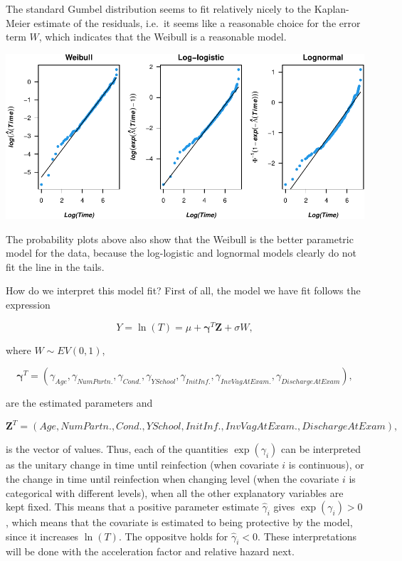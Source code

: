 \documentclass[
]{article}
\begin{document}
The standard Gumbel distribution seems to fit relatively nicely to the Kaplan-Meier estimate of the residuals, i.e.~it seems like a reasonable choice for the error term \(W\), which indicates that the Weibull is a reasonable model.

\includegraphics{practical_files/figure-latex/cumhaz-plot-1.pdf}

The probability plots above also show that the Weibull is the better parametric model for the data, because the log-logistic and lognormal models clearly do not fit the line in the tails.

How do we interpret this model fit? First of all, the model we have fit follows the expression

\[
Y = \ln(T) = \mu + \mathbf{\gamma}^T\mathbf{Z} + \sigma W,  
\]

where \(W \sim EV(0,1)\),

\[
\mathbf{\gamma}^T = (\gamma_{Age}, \gamma_{NumPartn.}, \gamma_{Cond.}, \gamma_{YSchool}, \gamma_{InitInf.}, \gamma_{InvVagAtExam.}, \gamma_{DischargeAtExam}),
\]

are the estimated parameters and

\[
\mathbf{Z}^T = (Age, NumPartn., Cond., YSchool, InitInf., InvVagAtExam., DischargeAtExam), 
\]

is the vector of values. Thus, each of the quantities \(\exp(\gamma_i)\) can be interpreted as the unitary change in time until reinfection (when covariate \(i\) is continuous), or the change in time until reinfection when changing level (when the covariate \(i\) is categorical with different levels), when all the other explanatory variables are kept fixed. This means that a positive parameter estimate \(\hat{\gamma}_i\) gives \(\exp(\gamma_i) > 0\), which means that the covariate is estimated to being protective by the model, since it increases \(\ln(T)\). The oppositve holds for \(\hat{\gamma}_i < 0\). These interpretations will be done with the acceleration factor and relative hazard next.
\end{document}
